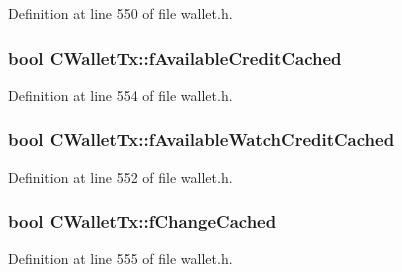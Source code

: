 Definition at line 550 of file wallet.\+h.

\hypertarget{class_c_wallet_tx_ac059d14ddf84de69430c57a12573b412}{}
\subsubsection[{f\+Available\+Credit\+Cached}]{\setlength{\rightskip}{0pt plus 5cm}bool C\+Wallet\+Tx\+::f\+Available\+Credit\+Cached\hspace{0.3cm}{\ttfamily [mutable]}}\label{class_c_wallet_tx_ac059d14ddf84de69430c57a12573b412}


Definition at line 554 of file wallet.\+h.

\hypertarget{class_c_wallet_tx_a5f15653f1307c561520a4fa26a12db33}{}
\subsubsection[{f\+Available\+Watch\+Credit\+Cached}]{\setlength{\rightskip}{0pt plus 5cm}bool C\+Wallet\+Tx\+::f\+Available\+Watch\+Credit\+Cached\hspace{0.3cm}{\ttfamily [mutable]}}\label{class_c_wallet_tx_a5f15653f1307c561520a4fa26a12db33}


Definition at line 552 of file wallet.\+h.

\hypertarget{class_c_wallet_tx_ab436a962e5e32d392928bc68af968bf1}{}
\subsubsection[{f\+Change\+Cached}]{\setlength{\rightskip}{0pt plus 5cm}bool C\+Wallet\+Tx\+::f\+Change\+Cached\hspace{0.3cm}{\ttfamily [mutable]}}\label{class_c_wallet_tx_ab436a962e5e32d392928bc68af968bf1}


Definition at line 555 of file wallet.\+h.

\hypertarget{class_c_wallet_tx_ad896ca73e00251f900185a1114c3c506}{}
